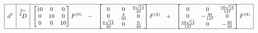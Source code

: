 \begin{table}
\begin{equation*}
\begin{array}{|>{\displaystyle}c|>{\displaystyle}c|>{\displaystyle}r >{\displaystyle}c >{\displaystyle}r >{\displaystyle}c >{\displaystyle}r|}
\hline
d^5 & \stackrel{3\times}{^2D} & \begin{bmatrix}10 & 0 & 0 \\ 0 & 10 & 0 \\ 0 & 0 & 10\end{bmatrix} F^{(0)} & - & \begin{bmatrix}0 & 0 & \frac{6\sqrt{14}}{49} \\ 0 & \frac{4}{49} & 0 \\ \frac{6\sqrt{14}}{49} & 0 & \frac{6}{49}\end{bmatrix} F^{(2)} & + & \begin{bmatrix}0 & 0 & \frac{10\sqrt{14}}{147} \\ 0 & -\frac{40}{147} & 0 \\ \frac{10\sqrt{14}}{147} & 0 & -\frac{20}{49}\end{bmatrix} F^{(4)} \\
\hline
\end{array}
\end{equation*}
\end{table}
\clearpage

